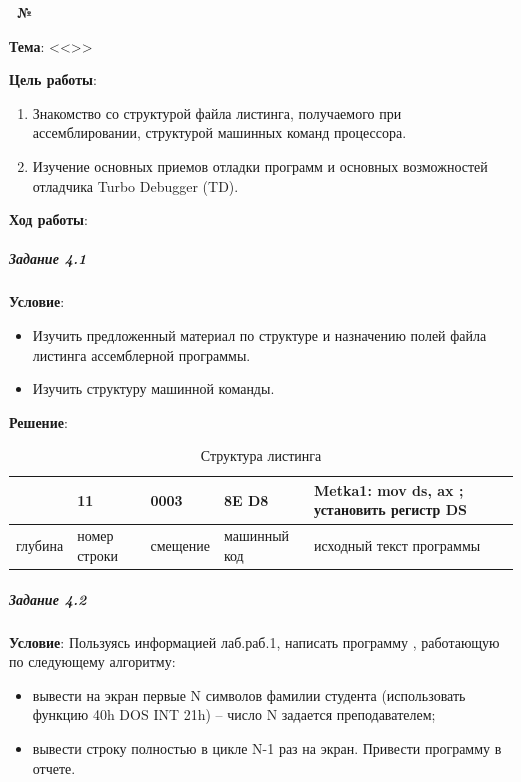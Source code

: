 \begin{center}
   \textbf{\titlePageWorkType~№\titlePageWorkNumber~\titlePageWorkPart}
\end{center}

\textbf{Тема}: <<\titlePageTopic>>

\textbf{Цель работы}: 

\begin{enumerate}
   \item Знакомство со структурой файла листинга, получаемого при ассемблировании, структурой машинных команд процессора.
   \item Изучение основных приемов отладки программ и основных возможностей отладчика Turbo Debugger (TD).
\end{enumerate}

\begin{center}
   \textbf{Ход работы}:
\end{center}



\subparagraph{Задание 4.1}

\textbf{Условие}:
\begin{itemize}
   \item Изучить предложенный материал по структуре и назначению полей файла листинга ассемблерной программы. 
   \item Изучить структуру машинной команды.
\end{itemize}

\textbf{Решение}:

\begin{table}[!ht]
   \centering
   \caption{Структура листинга}
   \begin{tabular}{|l|p{1.3cm}|l|p{2cm}|l|l|} 
      \hline
               & 11           & 0003      & 8E D8        & Metka1:   mov   ds, ax   ; установить регистр DS \\ \hline
      глубина  & номер строки & смещение  & машинный код & исходный текст программы                         \\ \hline
   \end{tabular}
\end{table}



\subparagraph{Задание 4.2}

\textbf{Условие}:
Пользуясь информацией лаб.раб.1, написать программу , работающую по следующему алгоритму:
\begin{itemize}
   \item вывести на экран первые N символов фамилии студента (использовать функцию 40h DOS INT 21h) – число N задается преподавателем;
   \item вывести строку полностью в цикле N-1 раз на экран. Привести программу в отчете.
\end{itemize}


